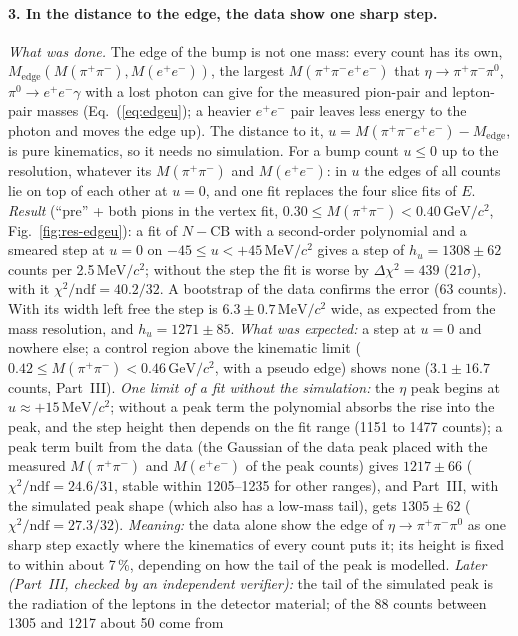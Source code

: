 \documentclass[11pt,a4paper]{article}
\newcommand{\piz}{\ensuremath{\pi^{0}}\xspace}
\newcommand{\ee}{\ensuremath{e^{+}e^{-}}\xspace}
\newcommand{\pipi}{\ensuremath{\pi^{+}\pi^{-}}\xspace}
\newcommand{\Mfour}{\ensuremath{M(\pi^{+}\pi^{-}e^{+}e^{-})}\xspace}
\newcommand{\Mee}{\ensuremath{M(e^{+}e^{-})}\xspace}
\newcommand{\Mpipi}{\ensuremath{M(\pi^{+}\pi^{-})}\xspace}
\newcommand{\GeVcc}{\ensuremath{\mathrm{GeV}/c^{2}}\xspace}
\newcommand{\MeVcc}{\ensuremath{\mathrm{MeV}/c^{2}}\xspace}
\newcommand{\Medge}{\ensuremath{M_{\mathrm{edge}}}}%
\begin{document}
\paragraph{3. In the distance to the edge, the data show one sharp step.} \emph{What was done.} The edge of the bump is not one mass:
every count has its own, $\Medge(\Mpipi,\Mee)$, the largest \Mfour that $\eta\to\pipi\piz$, $\piz\to\ee\gamma$ with a lost photon can give for the
measured pion-pair and lepton-pair masses (Eq.~(\ref{eq:edgeu}); a heavier \ee pair leaves less energy to the photon and moves the edge up).
The distance to it, $u=\Mfour-\Medge$, is pure kinematics, so it needs no simulation. For a bump count $u\le0$ up to the resolution, whatever its
\Mpipi and \Mee: in $u$ the edges of all counts lie on top of each other at $u=0$, and one fit replaces the four slice fits of $E$.
\emph{Result} (``pre'' + both pions in the vertex fit, $0.30\le\Mpipi<0.40$\,\GeVcc, Fig.~\ref{fig:res-edgeu}): a fit of $N-\mathrm{CB}$ with
a second-order polynomial and a smeared step at $u=0$ on $-45\le u<+45$\,\MeVcc gives a step of $h_u=1308\pm62$ counts per 2.5\,\MeVcc;
without the step the fit is worse by $\Delta\chi^2=439$ (21$\sigma$), with it $\chi^2/\mathrm{ndf}=40.2/32$. A bootstrap of the data
confirms the error (63 counts). With its width left free the step is $6.3\pm0.7$\,\MeVcc wide, as expected from the mass resolution, and
$h_u=1271\pm85$. \emph{What was expected:} a step at $u=0$ and nowhere else; a control region above the kinematic limit
($0.42\le\Mpipi<0.46$\,\GeVcc, with a pseudo edge) shows none ($3.1\pm16.7$ counts, Part~III). \emph{One limit of a fit without the
simulation:} the $\eta$ peak begins at $u\approx+15$\,\MeVcc; without a peak term the polynomial absorbs the rise into the peak, and the step
height then depends on the fit range (1151 to 1477 counts); a peak term built from the data (the Gaussian of the data peak placed with the
measured \Mpipi and \Mee of the peak counts) gives $1217\pm66$ ($\chi^2/\mathrm{ndf}=24.6/31$, stable within 1205--1235 for other ranges), and
Part~III, with the simulated peak shape (which also has a low-mass tail), gets $1305\pm62$ ($\chi^2/\mathrm{ndf}=27.3/32$). \emph{Meaning:}
the data alone show the edge of $\eta\to\pipi\piz$ as one sharp step exactly where the kinematics of every count puts it; its height is fixed
to within about 7\,\%, depending on how the tail of the peak is modelled. \emph{Later (Part~III, checked by an independent verifier):} the
tail of the simulated peak is the radiation of the leptons in the detector material; of the 88 counts between 1305 and 1217 about 50 come from
\end{document}
